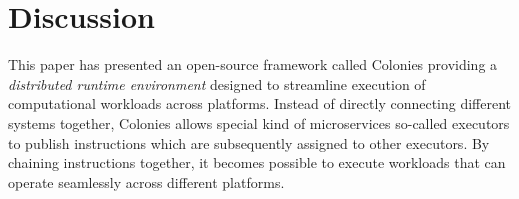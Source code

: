\documentclass{article}
\begin{document}



\section{Discussion}
This paper has presented an open-source framework called Colonies providing a \emph{distributed runtime environment} designed to streamline execution of computational workloads across platforms. Instead of directly connecting different systems together, Colonies allows special kind of microservices so-called executors to publish instructions which are subsequently assigned to other executors. By chaining instructions together, it becomes possible to execute workloads that can operate seamlessly across different platforms. 
\end{document}
